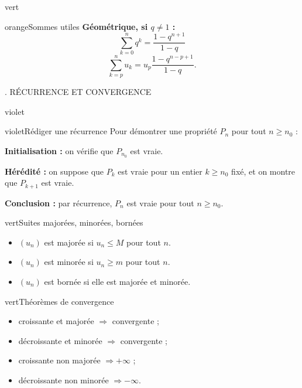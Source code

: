 \documentclass[11pt,a4paper]{article}
\newcommand{\Un}{\ensuremath{(u_n)}}
\newcommand{\tagcol}[2]{\begin{tcolorbox}[enhanced,colback=#1!11,colframe=#1!45!black,boxrule=0.42pt,arc=2mm,left=1mm,right=1mm,top=0.45mm,bottom=0.45mm,before skip=0mm,after skip=0.85mm,fontupper=\bfseries\scriptsize,colupper=#1!55!black]\centering #2\end{tcolorbox}}
\begin{document}
\begin{landscape}
\begin{minipage}[t]{0.242\linewidth}
\begin{panel}{vert}
\begin{fichebox}{orange}{Sommes utiles}
\textbf{Géométrique, si $q\neq1$ :}
\[
\sum_{k=0}^{n}q^k=\frac{1-q^{n+1}}{1-q}
\]
\[
\sum_{k=p}^{n}u_k=u_p\frac{1-q^{n-p+1}}{1-q}.
\]
\end{fichebox}

\end{panel}
\end{minipage}
\hfill
\begin{minipage}[t]{0.242\linewidth}
\tagcol{violet}{3. RÉCURRENCE ET CONVERGENCE}
\begin{panel}{violet}

\begin{fichebox}{violet}{Rédiger une récurrence}
Pour démontrer une propriété $P_n$ pour tout $n\geq n_0$ :

\medskip
\textbf{Initialisation :} on vérifie que $P_{n_0}$ est vraie.

\medskip
\textbf{Hérédité :} on suppose que $P_k$ est vraie pour un entier $k\geq n_0$ fixé, et on montre que $P_{k+1}$ est vraie.

\medskip
\textbf{Conclusion :} par récurrence, $P_n$ est vraie pour tout $n\geq n_0$.
\end{fichebox}

\begin{fichebox}{vert}{Suites majorées, minorées, bornées}
\begin{itemize}
    \item \Un{} est majorée si $u_n\leq M$ pour tout $n$.
    \item \Un{} est minorée si $u_n\geq m$ pour tout $n$.
    \item \Un{} est bornée si elle est majorée et minorée.
\end{itemize}
\end{fichebox}

\begin{fichebox}{vert}{Théorèmes de convergence}
\begin{itemize}
    \item croissante et majorée $\Longrightarrow$ convergente ;
    \item décroissante et minorée $\Longrightarrow$ convergente ;
    \item croissante non majorée $\Longrightarrow +\infty$ ;
    \item décroissante non minorée $\Longrightarrow -\infty$.
\end{itemize}
\end{fichebox}


\end{panel}
\end{minipage}
\end{landscape}
\end{document}
